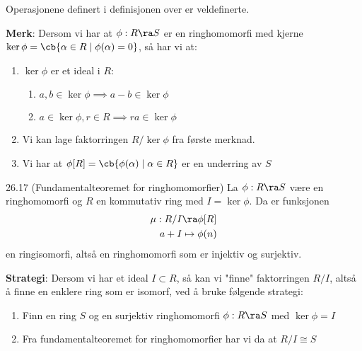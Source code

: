 \begin{theorem*}{}{}
	Operasjonene definert i definisjonen over er veldefinerte.
\end{theorem*}

\textbf{Merk}:
Dersom vi har at $\phi: R\ra S$ er en ringhomomorfi med kjerne
$\ker\phi=\cb{\alpha\in R\mid\phi(\alpha)=0}$, så har vi at:
\begin{enumerate}
	\item $\ker \phi$ er et ideal i $R$:
	      \begin{enumerate}
		      \item $a,b\in \ker \phi \implies a-b\in \ker \phi$
		      \item $a\in\ker\phi, r\in R\implies ra\in \ker\phi$
	      \end{enumerate}
	\item Vi kan lage faktorringen $R/\ker\phi$ fra første merknad.
	\item Vi har at $\phi[R]=\cb{\phi(\alpha)\mid\alpha\in R}$ er en underring av $S$
\end{enumerate}

\begin{theorem*}{26.17 (Fundamentalteoremet for ringhomomorfier)}{}
	La $\phi: R\ra S$ være en ringhomomorfi og $R$ en kommutativ ring med $I=\ker \phi$. Da er
	funksjonen
	\begin{align}
		\mu: R/I & \ra \phi[R]     \\
		a+I      & \mapsto \phi(n)
	\end{align}
	en ringisomorfi, altså en ringhomomorfi som er injektiv og surjektiv.
\end{theorem*}

\textbf{Strategi}: Dersom vi har et ideal $I\subset R$, så kan vi "finne" faktorringen $R/I$,
altså å finne en enklere ring som er isomorf, ved å bruke følgende strategi:
\begin{enumerate}
	\item Finn en ring $S$ og en surjektiv ringhomomorfi $\phi: R\ra S$ med $\ker\phi=I$
	\item Fra fundamentalteoremet for ringhomomorfier har vi da at $R/I\cong S$
\end{enumerate}


